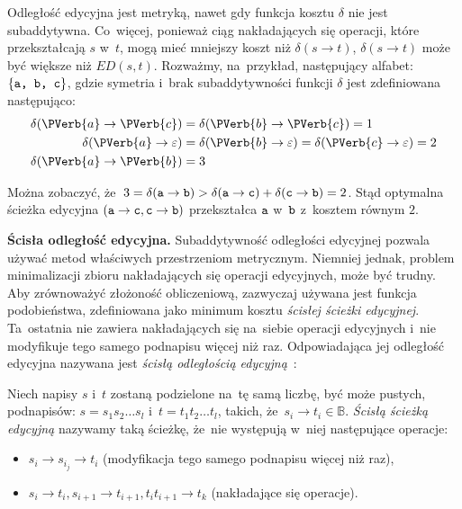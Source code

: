 \documentclass{praca1}
\begin{document}
Odległość edycyjna jest metryką, nawet gdy funkcja kosztu $\delta$ nie jest subaddytywna. Co~więcej, ponieważ ciąg nakładających się operacji, które przekształcają $s$ w~$t$, mogą mieć mniejszy koszt niż $\delta(s \rightarrow t)$, $\delta(s \rightarrow t)$ może być większe niż $ED(s,t)$. Rozważmy, na~przykład, następujący alfabet: $\{\verb|a, b, c|\}$, gdzie symetria i~brak subaddytywności funkcji $\delta$ jest zdefiniowana następująco:
\begin{align*}
\delta(\PVerb{a} \rightarrow \PVerb{c}) &= \delta(\PVerb{b} \rightarrow \PVerb{c}) = 1 \\
\delta(\PVerb{a} \rightarrow \varepsilon) &= \delta(\PVerb{b} \rightarrow \varepsilon) = \delta(\PVerb{c} \rightarrow \varepsilon) = 2 \\
\delta(\PVerb{a} \rightarrow \PVerb{b}) &= 3
\end{align*}

Można zobaczyć, że~$3 = \delta(\verb|a| \rightarrow \verb|b|) > \delta(\verb|a| \rightarrow \verb|c|) + \delta(\verb|c| \rightarrow \verb|b|) = 2$. Stąd optymalna ścieżka edycyjna $(\verb|a| \rightarrow \verb|c|, \verb|c| \rightarrow \verb|b|)$ przekształca $\verb|a|$ w~$\verb|b|$ z~kosztem równym $2$.

\textbf{Ścisła odległość edycyjna.} Subaddytywność odległości edycyjnej pozwala używać metod właściwych przestrzeniom metrycznym. Niemniej jednak, problem minimalizacji zbioru nakładających się operacji edycyjnych, może być trudny. Aby zrównoważyć złożoność obliczeniową, zazwyczaj używana jest funkcja podobieństwa, zdefiniowana jako minimum kosztu \emph{ścisłej ścieżki edycyjnej}. Ta~ostatnia nie zawiera nakładających się na~siebie operacji edycyjnych i~nie modyfikuje tego samego podnapisu więcej niż raz. Odpowiadająca jej odległość edycyjna nazywana jest \emph{ścisłą odległością edycyjną}~\cite{Boytsov2011:indexingmethods}:

\begin{definition}
Niech napisy $s$ i~$t$ zostaną podzielone na~tę samą liczbę, być może pustych, podnapisów: $s = s_1 s_2 \ldots s_l$ i~$t = t_1 t_2 \ldots t_l$, takich, że~$s_i \rightarrow t_i \in \mathbb{B}$. \emph{Ścisłą ścieżką edycyjną} nazywamy taką ścieżkę, że~nie występują w~niej następujące operacje:
\begin{itemize}
\item $s_i \rightarrow s_{i_j} \rightarrow t_i$ (modyfikacja tego samego podnapisu więcej niż raz),
\item $s_i \rightarrow t_i, s_{i+1} \rightarrow t_{i+1}, t_it_{i+1} \rightarrow t_k$ (nakładające się operacje).
\end{itemize}
\end{definition}
\end{document}
